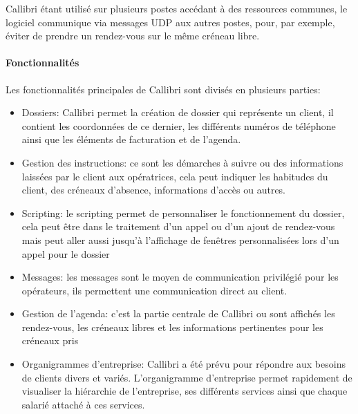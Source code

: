 \gls{Callibri} étant utilisé sur plusieurs postes accédant à des ressources communes, 
le logiciel communique via messages UDP aux autres postes, pour, par exemple, éviter de prendre 
un rendez-vous sur le même créneau libre. \newline

\paragraph{Fonctionnalités \newline}
Les fonctionnalités principales de \gls{Callibri} sont divisés en plusieurs parties: \newline
\begin{itemize}
    \item Dossiers: \gls{Callibri} permet la création de dossier qui représente un client,
    il contient les coordonnées de ce dernier, les différents numéros de téléphone ainsi que les éléments
    de facturation et de l'agenda. \newline

    \item Gestion des instructions: ce sont les démarches 
    à suivre ou des informations laissées par le client aux opératrices, cela peut indiquer les habitudes du client, 
    des créneaux d'absence, informations d'accès ou autres. \newline 


    \item Scripting: le scripting permet de personnaliser le fonctionnement du dossier,
    cela peut être dans le traitement d'un appel ou d'un ajout de rendez-vous mais
    peut aller aussi jusqu'à l'affichage de fenêtres personnalisées lors d'un appel pour le dossier 
    \newline
    
    \item Messages: les messages sont le moyen de communication privilégié pour les opérateurs,
    ils permettent une communication direct au client.
    \newline

    \item Gestion de l'agenda: c'est la partie centrale de \gls{Callibri} ou sont affichés les rendez-vous,
    les créneaux libres et les informations pertinentes pour les créneaux pris
    \newline
    
    \item Organigrammes d'entreprise: \gls{Callibri} a été prévu pour répondre 
    aux besoins de clients divers et variés. L'organigramme d'entreprise permet rapidement
     de visualiser la hiérarchie de l'entreprise, ses différents services ainsi 
     que chaque salarié attaché à ces services. \newline
\end{itemize}


